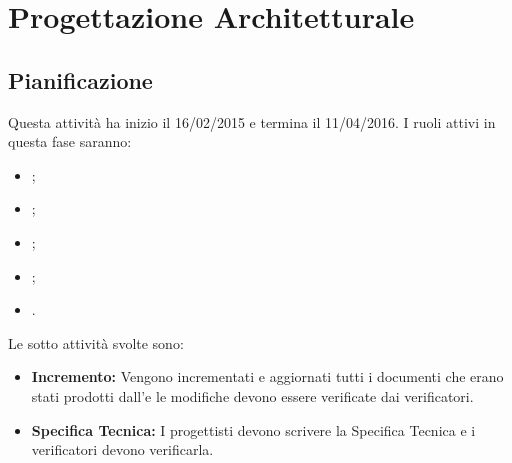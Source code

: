 \documentclass[12pt,a4paper]{article}
\begin{document}
\section{Progettazione Architetturale} %

\subsection{Pianificazione}

Questa attività ha inizio il 16/02/2015 e termina il 11/04/2016. I ruoli attivi in questa fase saranno:
\begin{itemize}
	\item \PM;
	\item \AM;
	\item \AN;
    \item \PR;
    \item \VR.
\end{itemize}
Le sotto attività svolte sono:
\begin{itemize}
	\item \textbf{Incremento:} Vengono incrementati e aggiornati tutti i documenti che erano stati prodotti dall'\AdR e le modifiche devono essere verificate dai verificatori.
    \item \textbf{Specifica Tecnica:} I progettisti devono scrivere la Specifica Tecnica e i verificatori devono verificarla.
\end{itemize}
\end{document}
